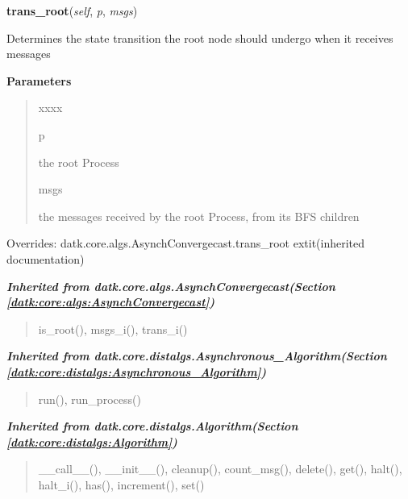     \vspace{0.5ex}

\hspace{.8\funcindent}\begin{boxedminipage}{\funcwidth}

    \raggedright \textbf{trans\_root}(\textit{self}, \textit{p}, \textit{msgs})

\setlength{\parskip}{2ex}
    Determines the state transition the root node should undergo when it 
    receives messages

\setlength{\parskip}{1ex}
      \textbf{Parameters}
      \vspace{-1ex}

      \begin{quote}
        \begin{Ventry}{xxxx}

          \item[p]

          the root Process

          \item[msgs]

          the messages received by the root Process, from its BFS children

        \end{Ventry}

      \end{quote}

      Overrides: datk.core.algs.AsynchConvergecast.trans\_root 	extit{(inherited documentation)}

    \end{boxedminipage}


\large{\textbf{\textit{Inherited from datk.core.algs.AsynchConvergecast\textit{(Section \ref{datk:core:algs:AsynchConvergecast})}}}}

\begin{quote}
is\_root(), msgs\_i(), trans\_i()
\end{quote}

\large{\textbf{\textit{Inherited from datk.core.distalgs.Asynchronous\_Algorithm\textit{(Section \ref{datk:core:distalgs:Asynchronous_Algorithm})}}}}

\begin{quote}
run(), run\_process()
\end{quote}

\large{\textbf{\textit{Inherited from datk.core.distalgs.Algorithm\textit{(Section \ref{datk:core:distalgs:Algorithm})}}}}

\begin{quote}
\_\_call\_\_(), \_\_init\_\_(), cleanup(), count\_msg(), delete(), get(), halt(), halt\_i(), has(), increment(), set()
\end{quote}

